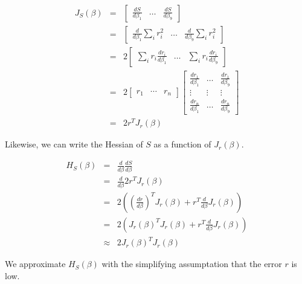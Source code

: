 \begin{eqnarray*}
	J_S(\beta) &=& \left[ \begin{array}{ccc}\frac{dS}{d\beta_1} & \ldots & \frac{dS}{d\beta_9}\end{array}\right]\\
	&=& \left[ \begin{array}{ccc}\frac{d}{d\beta_1}\sum_i r_i^2 & \ldots & \frac{d}{d\beta_9}\sum_i r_i^2\end{array}\right]\\
	&=& 2 \left[ \begin{array}{ccc}\sum_ir_i \frac{dr_i}{d\beta_1} & \ldots & \sum_i r_i \frac{dr_i}{d\beta_9}\end{array}\right]\\
	&=& 2 \left[ \begin{array}{ccc}r_1 & \cdots & r_n \end{array} \right]\left[
		\begin{array}{ccc}
		\frac{dr_1}{d\beta_1} & \ldots & \frac{dr_1}{d\beta_9}\\
		\vdots & \vdots & \vdots\\
		\frac{dr_n}{d\beta_1} & \ldots & \frac{dr_n}{d\beta_9}
		\end{array}\right]\\
	&=& 2 r^T J_r(\beta)
\end{eqnarray*}

\noindent Likewise, we can write the Hessian of $S$ as a function of $J_r(\beta)$.

\begin{eqnarray*}
	H_S(\beta) &=& \frac{d}{d\beta} \frac{dS}{d\beta}\\
	&=& \frac{d}{d\beta} 2 r^T J_r(\beta)\\
	&=& 2 \left(\left(\frac{dr}{d\beta}\right)^T J_r(\beta) + r^T \frac{d}{d\beta}J_r(\beta)\right)\\
	&=& 2 \left(J_r(\beta)^T J_r(\beta) + r^T \frac{d}{d\beta}J_r(\beta)\right)\\
	&\approx& 2 J_r(\beta)^T J_r(\beta)
\end{eqnarray*}

\noindent We approximate $H_S(\beta)$ with the simplifying assumptation that the error $r$ is low.

